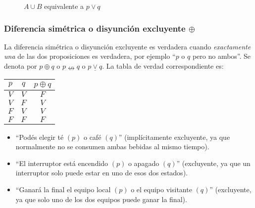\begin{figure}[h]
	\centering
	\caption*{$A \cup B$ equivalente a $p \lor q$}
\end{figure}

\subsubsection{Diferencia simétrica o disyunción excluyente $\oplus$}

La diferencia simétrica o disyunción excluyente es verdadera cuando \textit{exactamente una} de las dos proposiciones es verdadera, por ejemplo ``$p$ o $q$ pero no ambos''. Se denota por $p \oplus q$ o $p \nleftrightarrow q$ o $p \underline{\vee} q$. La tabla de verdad correspondiente es:

\begin{table}[H]
	\centering
	\begin{tabular}{|c|c|c|} \hline
		$p$ & $q$ & $p \oplus q$ \\ \hline
		$V$ & $V$ & $F$ \\
		$V$ & $F$ & $V$ \\
		$F$ & $V$ & $V$ \\
		$F$ & $F$ & $F$ \\ \hline
	\end{tabular}
\end{table}

\begin{fmd-example}
	\begin{itemize}
		\item ``Podés elegir té $(p)$ o café $(q)$'' (implícitamente excluyente, ya que normalmente no se consumen ambas bebidas al mismo tiempo). 
		\item ``El interruptor está encendido $(p)$ o apagado $(q)$'' (excluyente, ya que un interruptor solo puede estar en uno de esos dos estados).
		\item ``Ganará la final el equipo local $(p)$ o el equipo visitante $(q)$'' (excluyente, ya que solo uno de los dos equipos puede ganar la final).
	\end{itemize}
\end{fmd-example}

